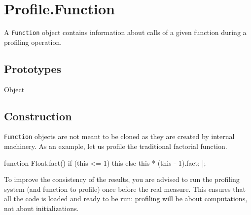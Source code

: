 
\section{Profile.Function}

A \lstinline|Function| object contains information about calls of a
given function during a profiling operation.

\subsection{Prototypes}

\begin{refObjects}
\item[Object]
\end{refObjects}

\subsection{Construction}

\lstinline|Function| objects are not meant to be cloned as they are created
by  internal machinery.  As an example, let us
profile the traditional factorial function.

\begin{urbiscript}
function Float.fact()
{
  if (this <= 1)
    this
  else
    this * (this - 1).fact;
}|;
\end{urbiscript}

To improve the consistency of the results, you are advised to run the
profiling system (and function to profile) once before the real measure.
This ensures that all the code is loaded and ready to be run: profiling will
be about computations, not about initializations.

